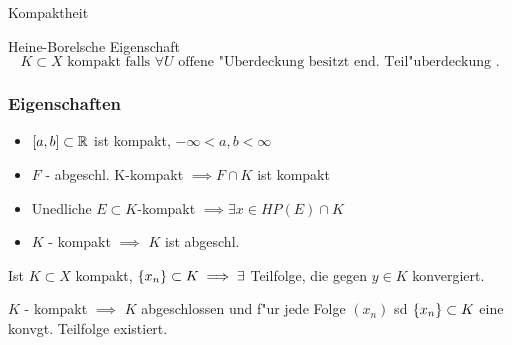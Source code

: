 \documentclass[class=article, crop=false]{standalone}
\begin{document}
\begin{zettel}{Kompaktheit}
\begin{flashcard}
    \begin{definition}[Kompaktheit] Heine-Borelsche Eigenschaft
\[
    K \subset X \text{ kompakt falls } \forall U \text{ offene "Uberdeckung besitzt end. Teil"uberdeckung } 
.\]
\end{definition}
\end{flashcard}

\subsubsection*{Eigenschaften}
\begin{itemize}
    \item $[a,b] \subset \mathbb{R}$ ist kompakt,  $-\infty < a,b < \infty $
    \item $F$ - abgeschl. K-kompakt $\implies F \cap K$ ist kompakt
    \item Unedliche $E \subset K $-kompakt  $\implies \exists x \in  HP (E) \cap K$ 
    \item $K$ - kompakt $\implies $ $K$ ist abgeschl.
\end{itemize}

\begin{corollary}
Ist $K \subset X$ kompakt, $\set{x_n } \subset K \implies  \exists$ Teilfolge, die gegen $y \in  K$ konvergiert.
\end{corollary}

\begin{theorem}
$K$ - kompakt $\implies $  $K$ abgeschlossen und f"ur jede Folge $(x_n )$ sd $\set{x_n } \subset K$ eine konvgt. Teilfolge existiert.
\end{theorem}


\end{zettel}
\end{document}
